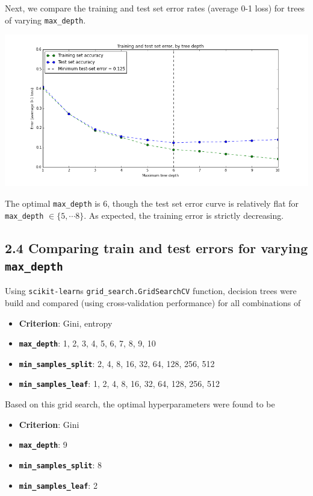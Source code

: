 \documentclass[paper=a4, fontsize=11pt]{scrartcl} %
\numberwithin{equation}{section} %
\numberwithin{figure}{section} %
\numberwithin{table}{section} %
\begin{document}
Next, we compare the training and test set error rates (average 0-1 loss) for trees of varying \texttt{max\_depth}.
\begin{center}
\includegraphics[scale=0.5]{./../figures/2_1_3.png}
\end{center}

The optimal \texttt{max\_depth} is 6, though the test set error curve is relatively flat for \texttt{max\_depth} $\in \{5, \cdots 8\}$. As expected, the training error is strictly decreasing.

\subsection*{2.4 Comparing train and test errors for varying \texttt{max\_depth}}

Using \texttt{scikit-learn}s \texttt{grid\_search.GridSearchCV} function, decision trees were build and compared (using cross-validation performance) for all combinations of
\begin{itemize}
\item \textbf{Criterion}: Gini, entropy
\item \textbf{\texttt{max\_depth}}: 1, 2, 3, 4, 5, 6, 7, 8, 9, 10
\item \textbf{\texttt{min\_samples\_split}}: 2, 4, 8, 16, 32, 64, 128, 256, 512
\item \textbf{\texttt{min\_samples\_leaf}}: 1, 2, 4, 8, 16, 32, 64, 128, 256, 512
\end{itemize}

Based on this grid search, the optimal hyperparameters were found to be
\begin{itemize}
\item \textbf{Criterion}: Gini
\item \textbf{\texttt{max\_depth}}: 9
\item \textbf{\texttt{min\_samples\_split}}: 8
\item \textbf{\texttt{min\_samples\_leaf}}: 2
\end{itemize}
\end{document}
